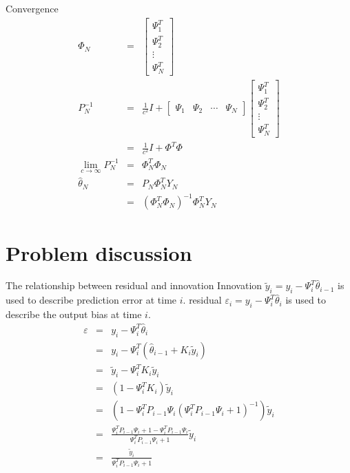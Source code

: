 \begin{frame}{Convergence}
\begin{eqnarray*}
\Phi_N &=& \begin{bmatrix} \Psi_{1}^T \\ \Psi_{2}^T \\ \vdots \\ \Psi_{N}^T \end{bmatrix}  \\
P_N^{-1} &=& \frac{1}{c^2}I+
\begin{bmatrix} \Psi_{1} & \Psi_{2} & \cdots & \Psi_{N} \end{bmatrix}
\begin{bmatrix} \Psi_{1}^T \\ \Psi_{2}^T \\ \vdots \\ \Psi_{N}^T \end{bmatrix}  \\
&=& \frac{1}{c^2}I+\Phi^T\Phi \\
\lim_{c\to\infty}P_N^{-1} &=& \Phi_N^T\Phi_N  \\
\hat\theta_N &=& P_N\Phi_N^T Y_N \\
 &=& (\Phi_N^T\Phi_N)^{-1}\Phi_N^T Y_N 
\end{eqnarray*}
\end{frame}

\section{Problem discussion}
\begin{frame}{ The relationship between residual and innovation }
Innovation $\tilde y_i = y_i - \Psi_i^T \hat\theta_{i-1}$ is used to describe prediction error at time $i$.
residual $\varepsilon_i = y_i - \Psi_i^T\hat\theta_i$ is used to describe the output bias at time $i$.
\begin{eqnarray*}
\varepsilon &=& y_i - \Psi_i^T\hat\theta_i  \\
&=& y_i - \Psi_i^T(\hat\theta_{i-1}+K_i \tilde y_i) \\
&=& \tilde y_i -\Psi_i^T K_i \tilde y_i \\
&=& (1-\Psi_i^T K_i) \tilde y_i \\
&=& (1-\Psi_i^T P_{i-1} \Psi_i(\Psi_i^T P_{i-1} \Psi_i+1)^{-1}) \tilde y_i \\
&=& \frac{\Psi_i^T P_{i-1} \Psi_i+1-\Psi_i^T P_{i-1} \Psi_i}{\Psi_i^T P_{i-1} \Psi_i+1} \tilde y_i \\
&=& \frac{\tilde y_i}{\Psi_i^T P_{i-1} \Psi_i+1}  
\end{eqnarray*}
\end{frame}

